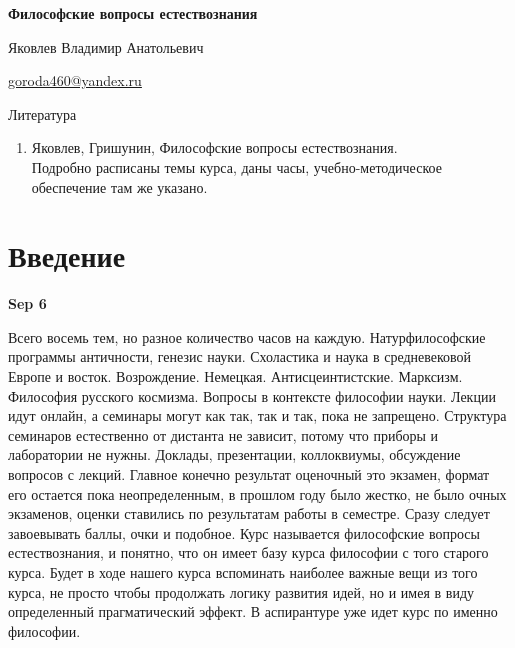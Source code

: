 \documentclass[a4paper, 12pt]{article}
\begin{document}
\null
\vfill

\begin{center}
	\begin{Large}
		\textbf{Философские вопросы естествознания}
	\end{Large}

	\vspace{\baselineskip}

	Яковлев Владимир Анатольевич

	\href{mailto:goroda460@yandex.ru}{goroda460@yandex.ru}
\end{center}

\vfill

Литература
\begin{enumerate}
	\item Яковлев, Гришунин, Философские вопросы естествознания.
		\\ Подробно расписаны темы курса, даны часы, учебно-методическое обеспечение там же указано.
\end{enumerate}

\clearpage

\tableofcontents

\clearpage

\section{Введение}

\hfill\textbf{Sep 6}

Всего восемь тем, но разное количество часов на каждую. Натурфилософские 
программы античности, генезис науки. Схоластика и наука в средневековой 
Европе и восток. Возрождение. Немецкая. Антисцеинтистские. Марксизм. 
Философия русского космизма. Вопросы в контексте философии науки. Лекции 
идут онлайн, а семинары могут как так, так и так, пока не запрещено. 
Структура семинаров естественно от дистанта не зависит, потому что 
приборы и лаборатории не нужны. Доклады, презентации, коллоквиумы, 
обсуждение вопросов с лекций. Главное конечно результат оценочный это 
экзамен, формат его остается пока неопределенным, в прошлом году было 
жестко, не было очных экзаменов, оценки ставились по результатам работы 
в семестре. Сразу следует завоевывать баллы, очки и подобное. Курс 
называется философские вопросы естествознания, и понятно, что он имеет 
базу курса философии с того старого курса. Будет в ходе нашего курса 
вспоминать наиболее важные вещи из того курса, не просто чтобы 
продолжать логику развития идей, но и имея в виду определенный 
прагматический эффект. В аспирантуре уже идет курс по именно философии.
\end{document}
